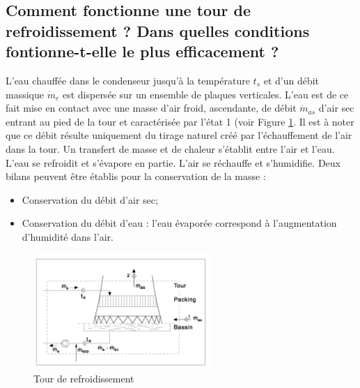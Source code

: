 \subsection{Comment fonctionne une tour de refroidissement ? Dans quelles conditions fontionne-t-elle le plus efficacement ?}
L'eau chauffée dans le condenseur jusqu'à la température $t_s$ et d'un débit massique $\dot{m}_e$ est dispersée sur un ensemble de plaques verticales. L'eau est de ce fait mise en contact avec une masse d'air froid, ascendante, de débit $\dot{m}_{as}$ d'air sec entrant au pied de la tour et caractérisée par l'état 1 (voir Figure \ref{fig:tour_de_refroidissement}. Il est à noter que ce débit résulte uniquement du tirage naturel créé par l'échauffement de l'air dans la tour. Un transfert de masse et de chaleur s'établit entre l'air et l'eau. L'eau se refroidit et s'évapore en partie. L'air se réchauffe et s'humidifie. Deux bilans peuvent être établis pour la conservation de la masse :
\begin{itemize}
	\item Conservation du débit d'air sec;
	\item Conservation du débit d'eau : l'eau évaporée correspond à l'augmentation d'humidité dans l'air.
\end{itemize}
\begin{figure}[h]\centering
	\includegraphics[width=0.6\textwidth]{figures/tour_de_refroidissement.png}
	\caption{Tour de refroidissement}
	\label{fig:tour_de_refroidissement}
\end{figure}

